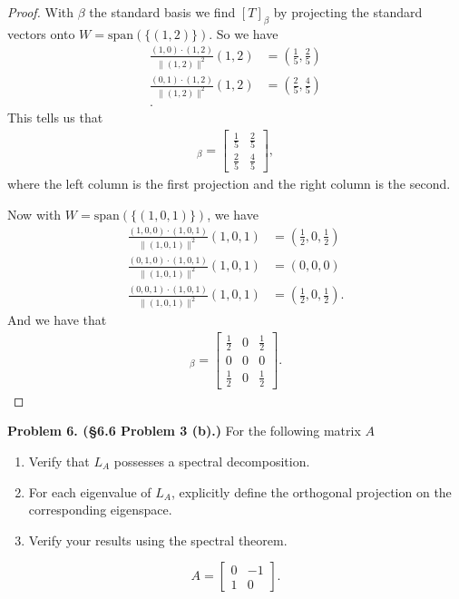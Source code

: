 \documentclass[leqno]{article}
\theoremstyle{nonumberplain}
\newtheorem{proof}{Proof}
\begin{document}
\begin{proof}
With $\beta$ the standard basis we find $[T]_\beta$ by projecting the standard vectors onto $W=\mathrm{span}(\{(1,2)\})$. So we have
\begin{align*}
\frac{(1,0)\cdot (1,2)}{\|(1,2)\|^2}(1,2)&=\left(\frac{1}{5},\frac{2}{5}\right)\\
\frac{(0,1)\cdot (1,2)}{\|(1,2)\|^2}(1,2)&=\left(\frac{2}{5},\frac{4}{5}\right)\\.
\end{align*}
This tells us that
\begin{align*}
[T]_\beta=\begin{bmatrix}
\frac{1}{5} & \frac{2}{5}\\
\frac{2}{5} & \frac{4}{5}
\end{bmatrix},
\end{align*}
where the left column is the first projection and the right column is the second.

Now with $W=\mathrm{span}(\{(1,0,1)\})$, we have
\begin{align*}
\frac{(1,0,0)\cdot (1,0,1)}{\|(1,0,1)\|^2}(1,0,1)&=\left(\frac{1}{2},0,\frac{1}{2}\right)\\
\frac{(0,1,0)\cdot (1,0,1)}{\|(1,0,1)\|^2}(1,0,1)&=\left(0,0,0\right)\\
\frac{(0,0,1)\cdot (1,0,1)}{\|(1,0,1)\|^2}(1,0,1)&=\left(\frac{1}{2},0,\frac{1}{2}\right).
\end{align*}
And we have that
\begin{align*}
[T]_\beta=\begin{bmatrix}
\frac{1}{2} & 0 &\frac{1}{2}\\
0 & 0 & 0\\
\frac{1}{2} & 0 &\frac{1}{2}
\end{bmatrix}.
\end{align*}
\end{proof}

\pagebreak




\noindent\textbf{Problem 6. (\S 6.6 Problem 3 (b).)} For the following matrix $A$
\begin{enumerate}[(1)]
\item Verify that $L_A$ possesses a spectral decomposition.
\item For each eigenvalue of $L_A$, explicitly define the orthogonal projection on the corresponding eigenspace.
\item Verify your results using the spectral theorem.
\end{enumerate}
\[
A=\begin{bmatrix}
0 & -1\\
1 & 0
\end{bmatrix}.
\]
\end{document}
